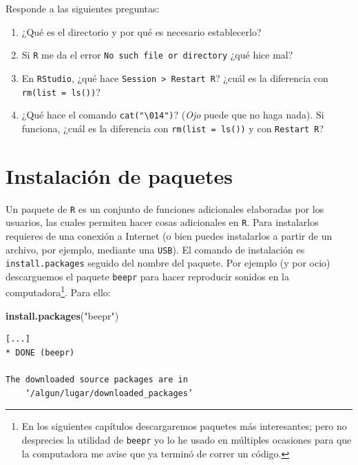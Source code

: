 \documentclass[
]{book}
\newenvironment{Shaded}{\begin{snugshade}}{\end{snugshade}}
\newcommand{\KeywordTok}[1]{\textcolor[rgb]{0.13,0.29,0.53}{\textbf{#1}}}
\newcommand{\NormalTok}[1]{#1}
\newcommand{\StringTok}[1]{\textcolor[rgb]{0.31,0.60,0.02}{#1}}
\begin{document}
Responde a las siguientes preguntas:

\begin{enumerate}
\def\labelenumi{\arabic{enumi}.}
\item
  ¿Qué es el directorio y por qué es necesario establecerlo?
\item
  Si \texttt{R} me da el error \texttt{\textquotesingle{}No\ such\ file\ or\ directory\textquotesingle{}} ¿qué hice mal?
\item
  En \texttt{RStudio}, ¿qué hace \texttt{Session\ \textgreater{}\ Restart\ R}? ¿cuál es la diferencia con \texttt{rm(list\ =\ ls())}?
\item
  ¿Qué hace el comando \texttt{cat("\textbackslash{}014")}? (\emph{Ojo} puede que no haga nada). Si funciona, ¿cuál es la diferencia con \texttt{rm(list\ =\ ls())} y con \texttt{Restart\ R}?
\end{enumerate}

\hypertarget{instalaciuxf3n-de-paquetes}{%
\section{Instalación de paquetes}\label{instalaciuxf3n-de-paquetes}}

Un paquete de \texttt{R} es un conjunto de funciones adicionales elaboradas por los usuarios, las cuales permiten hacer cosas adicionales en \texttt{R}. Para instalarlos requieres de una conexión a Internet (o bien puedes instalarlos a partir de un archivo, por ejemplo, mediante una \texttt{USB}). El comando de instalación es \texttt{install.packages} seguido del nombre del paquete. Por ejemplo (y por ocio) descarguemos el paquete \texttt{beepr} para hacer reproducir sonidos en la computadora\footnote{En los siguientes capítulos descargaremos paquetes más interesantes; pero no desprecies la utilidad de \texttt{beepr} yo lo he usado en múltiples ocasiones para que la computadora me avise que ya terminó de correr un código.}. Para ello:

\begin{Shaded}
\begin{Highlighting}[]
\KeywordTok{install.packages}\NormalTok{(}\StringTok{"beepr"}\NormalTok{)}
\end{Highlighting}
\end{Shaded}

\begin{verbatim}
[...]
* DONE (beepr)

The downloaded source packages are in
    ‘/algun/lugar/downloaded_packages’
\end{verbatim}
\end{document}
